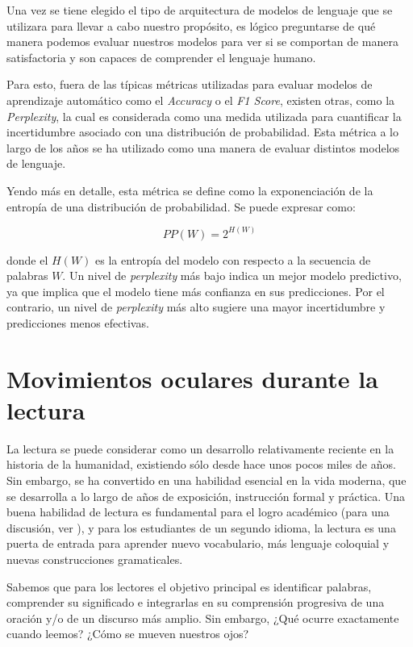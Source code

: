 Una vez se tiene elegido el tipo de arquitectura de modelos de lenguaje que se utilizara para llevar a cabo nuestro propósito, es lógico preguntarse de qué manera podemos evaluar nuestros modelos para ver si se comportan de manera satisfactoria y son capaces de comprender el lenguaje humano.

Para esto, fuera de las típicas métricas utilizadas para evaluar modelos de aprendizaje automático como el \textit{Accuracy} o el \textit{F1 Score}, existen otras, como la \textit{Perplexity}, la cual es considerada como una medida utilizada para cuantificar la incertidumbre asociado con una distribución de probabilidad. Esta métrica a lo largo de los años se ha utilizado como una manera de evaluar distintos modelos de lenguaje. \parencite{merity2017regularizingoptimizinglstmlanguage}

Yendo más en detalle, esta métrica se define como la exponenciación de la entropía de una distribución de probabilidad. Se puede expresar como:

\[
PP(W) = 2^{H(W)}
\]

donde el $H(W)$ es la entropía del modelo con respecto a la secuencia de palabras $W$. Un nivel de \textit{perplexity} más bajo indica un mejor modelo predictivo, ya que implica que el modelo tiene más confianza en sus predicciones. Por el contrario, un nivel de \textit{perplexity} más alto sugiere una mayor incertidumbre y predicciones menos efectivas.

\section{Movimientos oculares durante la lectura}

La lectura se puede considerar como un desarrollo relativamente reciente en la historia de la humanidad, existiendo sólo desde hace unos pocos miles de años. \parencite{ImmordinoYangDeacon2007} Sin embargo, se ha convertido en una habilidad esencial en la vida moderna, que se desarrolla a lo largo de años de exposición, instrucción formal y práctica.
Una buena habilidad de lectura es fundamental para el logro académico (para una discusión, ver \textcite{Renadya}), y para los estudiantes de un segundo idioma, la lectura es una puerta de entrada para aprender nuevo vocabulario, más lenguaje coloquial y nuevas construcciones gramaticales. \parencite{wilkinson}

Sabemos que para los lectores el objetivo principal es identificar palabras, comprender su significado e integrarlas en su comprensión progresiva de una oración y/o de un discurso más amplio. Sin embargo, ¿Qué ocurre exactamente cuando leemos? ¿Cómo se mueven nuestros ojos?

